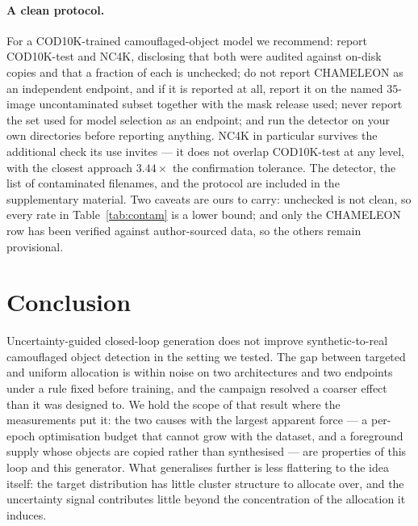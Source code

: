 \documentclass{article}
\begin{document}
\paragraph{A clean protocol.}
For a COD10K-trained camouflaged-object model we recommend: report COD10K-test
and NC4K, disclosing that both were audited against on-disk copies and that a
fraction of each is unchecked; do not report CHAMELEON as an independent
endpoint, and if it is reported at all, report it on the named $35$-image
uncontaminated subset together with the mask release used; never report the set
used for model selection as an endpoint; and run the detector on your own
directories before reporting anything. NC4K in particular survives the
additional check its use invites --- it does not overlap COD10K-test at any
level, with the closest approach $3.44\times$ the confirmation tolerance.
The detector, the list of contaminated filenames, and the protocol are included in the
supplementary material.
Two caveats are ours to carry: unchecked is not clean, so every rate in
Table~\ref{tab:contam} is a lower bound; and only the CHAMELEON row has been
verified against author-sourced data, so the others remain provisional.

\section{Conclusion}
\label{sec:conclusion}

Uncertainty-guided closed-loop generation does not improve synthetic-to-real
camouflaged object detection in the setting we tested. The gap between targeted
and uniform allocation is within noise on two architectures and two endpoints
under a rule fixed before training, and the campaign resolved a coarser effect
than it was designed to. We hold the scope of that result where the measurements
put it: the two causes with the largest apparent force --- a per-epoch
optimisation budget that cannot grow with the dataset, and a foreground supply
whose objects are copied rather than synthesised --- are properties of this loop
and this generator. What generalises further is less flattering to the idea
itself: the target distribution has little cluster structure to allocate over,
and the uncertainty signal contributes little beyond the concentration of the
allocation it induces.
\end{document}
